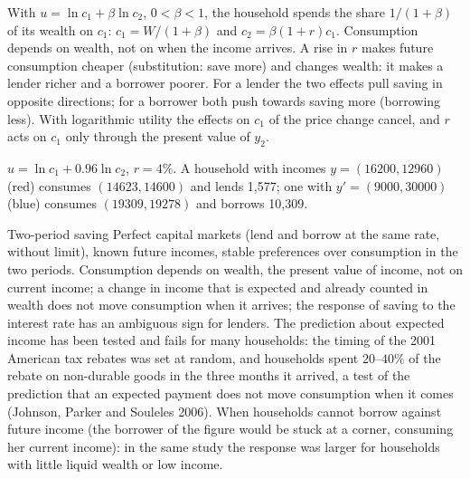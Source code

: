 With $u = \ln c_1 + \beta\ln c_2$, $0 < \beta < 1$, the household spends the share
$1/(1 + \beta)$ of its wealth on $c_1$: $c_1 = W/(1 + \beta)$ and
$c_2 = \beta(1 + r)c_1$. Consumption depends on wealth, not on when the income
arrives. A rise in $r$ makes future consumption cheaper (substitution:
save more) and changes wealth: it makes a lender richer and a borrower
poorer. For a lender the two effects pull saving in opposite directions;
for a borrower both push towards saving more (borrowing less). With
logarithmic utility the effects on $c_1$ of the price change cancel, and $r$
acts on $c_1$ only through the present value of $y_2$.

\begin{omfigure}

{\small $u = \ln c_1 + 0.96\ln c_2$, $r = 4\%$. A household with incomes
$y = (16200, 12960)$ (red) consumes $(14623, 14600)$ and lends 1,577; one with
$y' = (9000, 30000)$ (blue) consumes $(19309, 19278)$ and borrows 10,309.}
\end{omfigure}

\begin{model}{Two-period saving}
\assumes Perfect capital markets (lend and borrow at the same rate, without
limit), known future incomes, stable preferences over consumption in the
two periods.
\predicts Consumption depends on wealth, the present value of income, not on
current income; a change in income that is expected and already counted in
wealth does not move consumption when it arrives; the response of saving to
the interest rate has an ambiguous sign for lenders.
\tested The prediction about expected income has been tested and fails
for many households: the timing of the 2001 American tax rebates was set at
random, and households spent $20$--$40\%$ of the rebate on non-durable goods
in the three months it arrived, a test of the prediction that an expected
payment does not move consumption when it comes (Johnson, Parker and
Souleles 2006). %
\breaks When households cannot borrow against future income (the borrower
of the figure would be stuck at a corner, consuming her current income): in
the same study the response was larger for households with little liquid
wealth or low income. %
\end{model}

